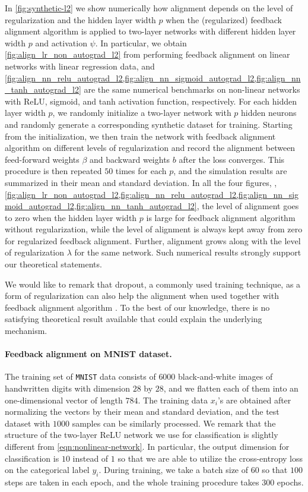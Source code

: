 In \cref{fig:synthetic-l2} we show numerically how alignment depends on the level of regularization and the hidden layer width $p$ when the (regularized) feedback alignment algorithm is applied to two-layer networks with different hidden layer width $p$ and activation $\psi$. In particular, we obtain \cref{fig:align_lr_non_autograd_l2} from performing feedback alignment on linear networks with linear regression data, and \cref{fig:align_nn_relu_autograd_l2,fig:align_nn_sigmoid_autograd_l2,fig:align_nn_tanh_autograd_l2} are the same numerical benchmarks on non-linear networks with ReLU, sigmoid, and tanh activation function, respectively. For each hidden layer width $p$, we randomly initialize a two-layer network with $p$ hidden neurons and randomly generate a corresponding synthetic dataset for training. Starting from the initialization, we then train the network with feedback alignment algorithm on different levels of regularization and record the alignment between feed-forward weights $\beta$ and backward weights $b$ after the loss converges. This procedure is then repeated $50$ times for each $p$, and the simulation results are summarized in their mean and standard deviation. In all the four figures, \ie,  \cref{fig:align_lr_non_autograd_l2,fig:align_nn_relu_autograd_l2,fig:align_nn_sigmoid_autograd_l2,fig:align_nn_tanh_autograd_l2}, the level of alignment goes to zero when the hidden layer width $p$ is large for feedback alignment algorithm without regularization, while the level of alignment is always kept away from zero for regularized feedback alignment. Further, alignment grows along with the level of regularization $\lambda$ for the same network. Such numerical results strongly support our theoretical statements.

We would like to remark that dropout, a commonly used training technique, as a form of regularization can also help the alignment when used together with feedback alignment algorithm \citep{wager2013dropout}. To the best of our knowledge, there is no satisfying theoretical result available that could explain the underlying mechanism.


\paragraph{Feedback alignment on MNIST dataset.}

The training set of \texttt{MNIST} data consists of $6000$ black-and-white images of handwritten digits with dimension $28$ by $28$, and we flatten each of them into an one-dimensional vector of length $784$. The training data $x_i$'s are obtained after normalizing the vectors by their mean and standard deviation, and the test dataset with $1000$ samples can be similarly processed. We remark that the structure of the two-layer ReLU network we use for classification is slightly different from \eqref{eqn:nonlinear-network}. In particular, the output dimension for classification is $10$ instead of $1$ so that we are able to utilize the cross-entropy loss on the categorical label $y_i$. During training, we take a batch size of $60$ so that $100$ steps are taken in each epoch, and the whole training procedure takes $300$ epochs. 

